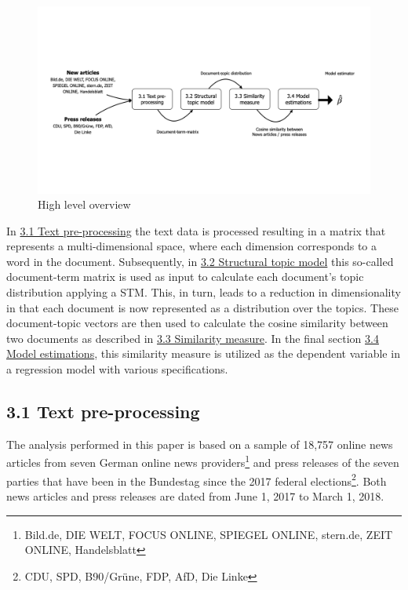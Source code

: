\documentclass[
  12pt,
]{article}
\begin{document}
\begin{figure}
\centering
\includegraphics{../figs/high_level_overview.png}
\caption{High level overview}
\end{figure}

In \protect\hyperlink{text-pre-processing}{3.1 Text pre-processing} the
text data is processed resulting in a matrix that represents a
multi-dimensional space, where each dimension corresponds to a word in
the document. Subsequently, in
\protect\hyperlink{structural-topic-model}{3.2 Structural topic model}
this so-called document-term matrix is used as input to calculate each
document's topic distribution applying a STM. This, in turn, leads to a
reduction in dimensionality in that each document is now represented as
a distribution over the topics. These document-topic vectors are then
used to calculate the cosine similarity between two documents as
described in \protect\hyperlink{similarity-measure}{3.3 Similarity
measure}. In the final section
\protect\hyperlink{34-model-estimations}{3.4 Model estimations}, this
similarity measure is utilized as the dependent variable in a regression
model with various specifications.

\hypertarget{text-pre-processing}{%
\subsection{3.1 Text pre-processing}\label{text-pre-processing}}

The analysis performed in this paper is based on a sample of 18,757
online news articles from seven German online news providers\footnote{Bild.de,
  DIE WELT, FOCUS ONLINE, SPIEGEL ONLINE, stern.de, ZEIT ONLINE,
  Handelsblatt} and press releases of the seven parties that have been
in the Bundestag since the 2017 federal elections\footnote{CDU, SPD,
  B90/Grüne, FDP, AfD, Die Linke}. Both news articles and press releases
are dated from June 1, 2017 to March 1, 2018.
\end{document}
